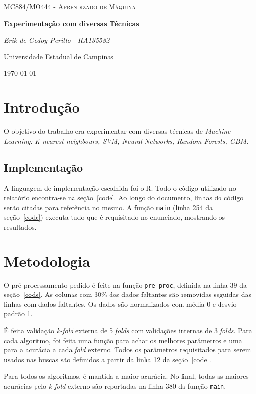 \documentclass[10pt]{article}
\newcommand{\tit}[1]{\textit{#1}}
\newcommand{\ttt}[1]{\texttt{#1}}
\begin{document}
\begin{titlepage}
	\centering
	{\scshape\Large MC884/MO444 - Aprendizado de Máquina\par}
	\vspace{1.5cm}
    {\huge\bfseries Experimentação com diversas Técnicas\par}
	\vspace{1cm}
	{\itshape Erik de Godoy Perillo - RA135582\par}
	\vfill
	Universidade Estadual de Campinas
	\vfill
	{\large \today\par}
\end{titlepage}

\newpage

\section{Introdução}
O objetivo do trabalho era experimentar com diversas técnicas de
\tit{Machine Learning:} \tit{K-nearest neighbours, SVM, Neural Networks,
    Random Forests, GBM.}

\subsection{Implementação}
A linguagem de implementação escolhida foi o R.
Todo o código utilizado no relatório encontra-se na seção~\ref{code}.
Ao longo do documento, linhas do código serão citadas para referência no mesmo.
A função \ttt{main} (linha 254 da seção~\ref{code}) executa tudo que é
requisitado no enunciado, mostrando os resultados.

\section{Metodologia}
O pré-processamento pedido é feito na função \ttt{pre\_proc}, definida na linha
$39$ da seção~\ref{code}. As colunas com 30\% dos dados faltantes são
removidas seguidas das linhas com dados faltantes. Os dados são normalizados
com média 0 e desvio padrão 1.

É feita validação \tit{k-fold} externa de 5 \tit{folds} com
validações internas de 3 \tit{folds}. Para cada algoritmo,
foi feita uma função para achar os melhores parâmetros e uma para a
acurácia a cada \tit{fold} externo.
Todos os parâmetros requisitados para serem usados nas buscas são definidos
a partir da linha 12 da seção~\ref{code}.

Para todos os algoritmos, é mantida a maior acurácia.
No final, todas as maiores acurácias pelo \tit{k-fold} externo são
reportadas na linha 380 da função \ttt{main}.
\end{document}
